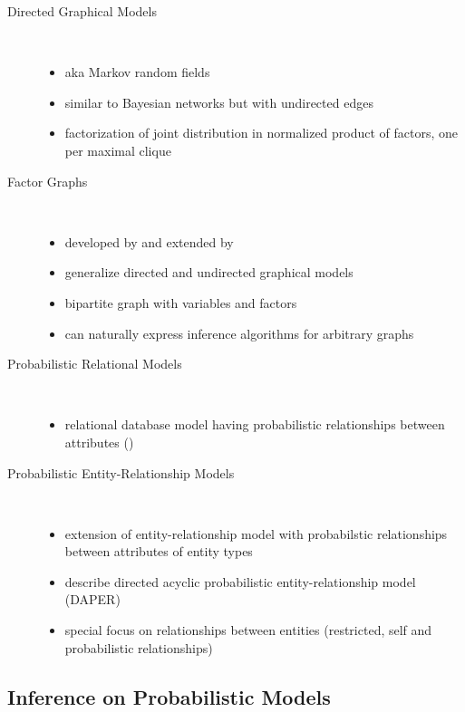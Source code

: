 \begin{description}
\item[Directed Graphical Models]\ 
\begin{itemize}
\item aka Markov random fields
\item similar to Bayesian networks but with undirected edges
\item factorization of joint distribution in normalized product of factors, one per maximal clique
\end{itemize}

\item[Factor Graphs]\ 
\begin{itemize}
\item developed by \textcite{kschischang2001factor} and extended by \textcite{frey2002extending}
\item generalize directed and undirected graphical models
\item bipartite graph with variables and factors
\item can naturally express inference algorithms for arbitrary graphs
\end{itemize}

\item[Probabilistic Relational Models]\ 
\begin{itemize}
\item relational database model having probabilistic relationships between attributes (\cite{friedman1999learning})
\end{itemize}

\item[Probabilistic Entity-Relationship Models]\ 
\begin{itemize}
\item extension of entity-relationship model with probabilstic relationships between attributes of entity types
\item \cite{heckerman2007probabilistic} describe directed acyclic probabilistic entity-relationship model (DAPER)
\item special focus on relationships between entities (restricted, self and probabilistic relationships)
\end{itemize}
\end{description}

\subsection{Inference on Probabilistic Models}

